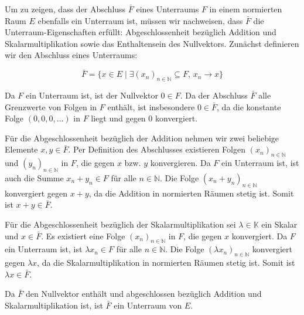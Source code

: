 Um zu zeigen, dass der Abschluss $\bar{F}$ eines Unterraums $F$ in einem normierten Raum $E$ ebenfalls ein Unterraum ist, müssen wir nachweisen, dass $\bar{F}$ die Unterraum-Eigenschaften erfüllt: Abgeschlossenheit bezüglich Addition und Skalarmultiplikation sowie das Enthaltensein des Nullvektors. Zunächst definieren wir den Abschluss eines Unterraums:

\begin{equation*}
\bar{F} = \{ x \in E \mid \exists (x_n)_{n \in \mathbb{N}} \subseteq F, \, x_n \to x \}
\end{equation*}

Da $F$ ein Unterraum ist, ist der Nullvektor $0 \in F$. Da der Abschluss $\bar{F}$ alle Grenzwerte von Folgen in $F$ enthält, ist insbesondere $0 \in \bar{F}$, da die konstante Folge $(0, 0, 0, \ldots)$ in $F$ liegt und gegen $0$ konvergiert.

Für die Abgeschlossenheit bezüglich der Addition nehmen wir zwei beliebige Elemente $x, y \in \bar{F}$. Per Definition des Abschlusses existieren Folgen $(x_n)_{n \in \mathbb{N}}$ und $(y_n)_{n \in \mathbb{N}}$ in $F$, die gegen $x$ bzw. $y$ konvergieren. Da $F$ ein Unterraum ist, ist auch die Summe $x_n + y_n \in F$ für alle $n \in \mathbb{N}$. Die Folge $(x_n + y_n)_{n \in \mathbb{N}}$ konvergiert gegen $x + y$, da die Addition in normierten Räumen stetig ist. Somit ist $x + y \in \bar{F}$.

Für die Abgeschlossenheit bezüglich der Skalarmultiplikation sei $\lambda \in \mathbb{K}$ ein Skalar und $x \in \bar{F}$. Es existiert eine Folge $(x_n)_{n \in \mathbb{N}}$ in $F$, die gegen $x$ konvergiert. Da $F$ ein Unterraum ist, ist $\lambda x_n \in F$ für alle $n \in \mathbb{N}$. Die Folge $(\lambda x_n)_{n \in \mathbb{N}}$ konvergiert gegen $\lambda x$, da die Skalarmultiplikation in normierten Räumen stetig ist. Somit ist $\lambda x \in \bar{F}$.

Da $\bar{F}$ den Nullvektor enthält und abgeschlossen bezüglich Addition und Skalarmultiplikation ist, ist $\bar{F}$ ein Unterraum von $E$.

